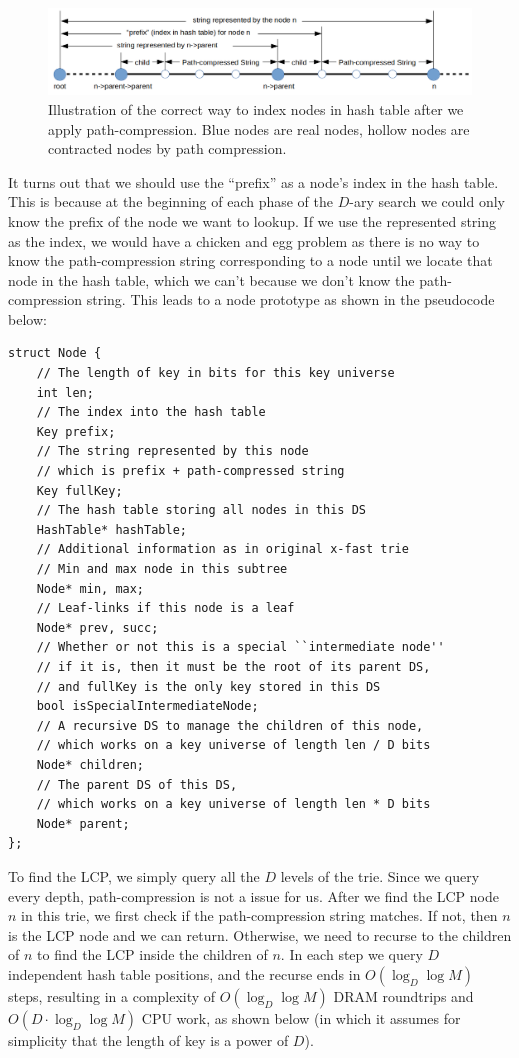\documentclass[11pt, usletter]{article}
\begin{document}
\begin{figure}[!htb]
  \includegraphics[width=\linewidth]{mlpindex_node.png}
\caption{Illustration of the correct way to index nodes in hash table after we apply path-compression.
Blue nodes are real nodes, hollow nodes are contracted nodes by path compression.}
\label{mlpindex_node}
\end{figure}

It turns out that we should use the ``prefix'' as a node's index 
in the hash table. This is because at the beginning of each phase of the $D$-ary search
we could only know the prefix of the node we want to lookup. 
If we use the represented string as the index, we would have a chicken and egg problem as 
there is no way to know the path-compression string corresponding to a node
until we locate that node in the hash table, which we can't because we don't know the path-compression string. 
This leads to a node prototype as shown in the pseudocode below:

\singlespacing\begin{codebox}
\begin{verbatim}
struct Node {
    // The length of key in bits for this key universe
    int len;
    // The index into the hash table
    Key prefix;
    // The string represented by this node
    // which is prefix + path-compressed string
    Key fullKey;
    // The hash table storing all nodes in this DS
    HashTable* hashTable;
    // Additional information as in original x-fast trie
    // Min and max node in this subtree 
    Node* min, max;
    // Leaf-links if this node is a leaf
    Node* prev, succ;
    // Whether or not this is a special ``intermediate node''
    // if it is, then it must be the root of its parent DS,
    // and fullKey is the only key stored in this DS
    bool isSpecialIntermediateNode;
    // A recursive DS to manage the children of this node,
    // which works on a key universe of length len / D bits
    Node* children;
    // The parent DS of this DS, 
    // which works on a key universe of length len * D bits
    Node* parent;
};
\end{verbatim}
\end{codebox}\doublespacing

To find the LCP, we simply query all the $D$ levels of the trie. 
Since we query every depth, path-compression is not a issue for us.
After we find the LCP node $n$ in this trie, we first check if the path-compression string matches. 
If not, then $n$ is the LCP node and we can return. Otherwise, 
we need to recurse to the children of $n$ to find the LCP inside the children of $n$. 
In each step we query $D$ independent hash table positions, and the recurse ends in $O(\log_D\log M)$ steps, 
resulting in a complexity of $O(\log_D\log M)$ DRAM roundtrips and $O(D\cdot\log_D\log M)$ CPU work,
as shown below (in which it assumes for simplicity that the length of key is a power of $D$).
\end{document}
